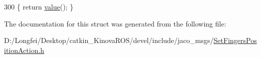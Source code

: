\begin{DoxyCode}
300 \{ \textcolor{keywordflow}{return} \hyperlink{structros_1_1message__traits_1_1Definition_3_01_1_1jaco__msgs_1_1SetFingersPositionAction___3_01ContainerAllocator_01_4_01_4_a931a889afb46ce9c4bf7cf95e67a24e0}{value}(); \}
\end{DoxyCode}


The documentation for this struct was generated from the following file\+:\begin{DoxyCompactItemize}
\item 
D\+:/\+Longfei/\+Desktop/catkin\+\_\+\+Kinova\+R\+O\+S/devel/include/jaco\+\_\+msgs/\hyperlink{SetFingersPositionAction_8h}{Set\+Fingers\+Position\+Action.\+h}\end{DoxyCompactItemize}
